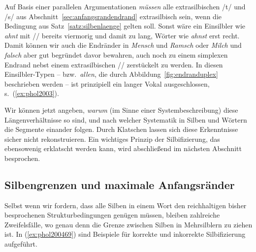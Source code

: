 Auf Basis einer parallelen Argumentationen \textit{müssen} alle extrasilbischen /t/ und /s/ aus Abschnitt~\ref{sec:anfangsrandendrand} extrasilbisch sein, wenn die Bedingung aus Satz~\ref{satz:silbenlaenge} gelten soll.
Sonst wäre ein Einsilbler wie \textit{ahnt} mit // bereits viermorig und damit zu lang, Wörter wie \textit{ahnst} erst recht.
Damit können wir auch die Endränder in \textit{Mensch} und \textit{Ramsch} oder \textit{Milch} und \textit{falsch} aber gut begründet davor bewahren, auch noch zu einem simplexen Endrand nebst einem extrasilbischen // zerstückelt zu werden.
In diesen Einsilbler-Typen -- bzw.\ \textit{allen}, die durch Abbildung~\ref{fig:endranduplex} beschrieben werden -- ist prinzipiell ein langer Vokal ausgeschlossen, s.\ (\ref{ex:phol2003}).

\begin{exe}
  \ex \label{ex:phol2003}
  \begin{xlist}
  	\ex *\textipa{[mE:nS]}
  	\ex *\textipa{[ra:mS]}
  	\ex *\textipa{[mi:l\c{c}]}
  	\ex *\textipa{[fa:lS]}
  \end{xlist}
\end{exe}

Wir können jetzt angeben, \textit{warum} (im Sinne einer Systembeschreibung) diese Längenverhältnisse so sind, und nach welcher Systematik in Silben und Wörtern die Segmente einander folgen.
Durch Klatschen lassen sich diese Erkenntnisse sicher nicht rekonstruieren.
Ein wichtiges Prinzip der Silbifizierung, das ebensowenig erklatscht werden kann, wird abschließend im nächsten Abschnitt besprochen.

\subsection{Silbengrenzen und maximale Anfangsränder}

\label{sec:maxanfangsrand}

Selbst wenn wir fordern, dass alle Silben in einem Wort den reichhaltigen bisher besprochenen Strukturbedingungen genügen müssen, bleiben zahlreiche Zweifelsfälle, wo genau denn die Grenze zwischen Silben in Mehrsilblern zu ziehen ist.
In (\ref{ex:phol200469}) sind Beispiele für korrekte und inkorrekte Silbifizierung aufgeführt.

\begin{exe}
  \ex \label{ex:phol200469}
  \begin{xlist}
  \end{xlist}
\end{exe}

